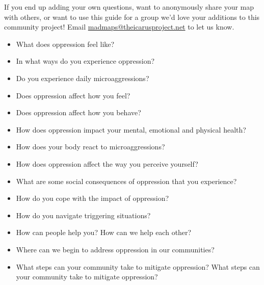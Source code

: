 If you end up adding your own questions, want to anonymously share your map with others, or want to use this guide for a group we’d love your additions to this community project! Email \href{mailto:madmaps@theicarusproject.net}{madmaps@theicarusproject.net} to let us know.


\begin{itemize}  
	\item What does oppression feel like?
	\item In what ways do you experience oppression?
	\item Do you experience daily microaggressions?
	\item Does oppression affect how you feel?
	\item Does oppression affect how you behave?
	\item How does oppression impact your mental, emotional and physical health?
	\item How does your body react to microaggressions?
	\item How does oppression affect the way you perceive yourself?
	\item What are some social consequences of oppression that you experience?
	\item How do you cope with the impact of oppression?
	\item How do you navigate triggering situations?
	\item How can people help you? How can we help each other?
	\item Where can we begin to address oppression in our communities?
	\item What steps can your community take to mitigate oppression? What steps can your community take to mitigate oppression?
\end{itemize}

